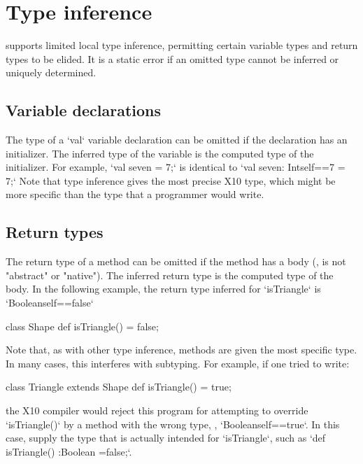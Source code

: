 {\section{Type inference}
\label{TypeInference}

\XtenCurrVer{} supports limited local type inference, permitting
certain variable types and return types to be elided.
It is a static error if an omitted type cannot be inferred or
uniquely determined.

\subsection{Variable declarations}

The type of a \xcd`val` variable declaration can be omitted if the
declaration has an initializer.  The inferred type of the
variable is the computed type of the initializer.
For example, 
\xcd`val seven = 7;`
is identical to 
\xcd`val seven: Int{self==7} = 7;`
Note that type inference gives the most precise X10 type, which might be more
specific than the type that a programmer would write.




\subsection{Return types}

The return type of a method can be omitted if the method has a body (\ie, is
not \xcd"abstract" or \xcd"native"). The inferred return type is the computed
type of the body.  In the following example, the return type inferred for
\xcd`isTriangle` is 
\xcd`Boolean{self==false}`
\begin{xten}
class Shape {
  def isTriangle() = false; 
}  
\end{xten}
%
Note that, as with other type inference, methods are given the most specific
type.  In many cases, this interferes with subtyping.  For example, if one
tried to write: 
\begin{xten}
class Triangle extends Shape {
  def isTriangle() = true;
}
\end{xten}
\noindent
the X10 compiler would reject this program for attempting to override
\xcd`isTriangle()` by a method with the wrong type, \viz,
\xcd`Boolean{self==true}`.  In this case, supply the type that is actually
intended for \xcd`isTriangle`, such as 
\xcd`def isTriangle() :Boolean =false;`. 

}
